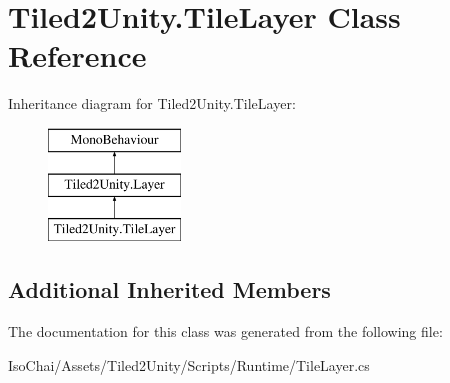\hypertarget{class_tiled2_unity_1_1_tile_layer}{}\section{Tiled2\+Unity.\+Tile\+Layer Class Reference}
\label{class_tiled2_unity_1_1_tile_layer}
Inheritance diagram for Tiled2\+Unity.\+Tile\+Layer\+:\begin{figure}[H]
\begin{center}
\leavevmode
\includegraphics[height=3.000000cm]{class_tiled2_unity_1_1_tile_layer}
\end{center}
\end{figure}
\subsection*{Additional Inherited Members}


The documentation for this class was generated from the following file\+:\begin{DoxyCompactItemize}
\item 
Iso\+Chai/\+Assets/\+Tiled2\+Unity/\+Scripts/\+Runtime/Tile\+Layer.\+cs\end{DoxyCompactItemize}
